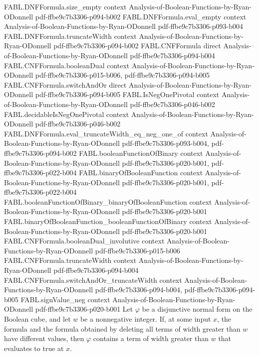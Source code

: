 \begin{theorem}
\proofstep
  {FABL.DNFFormula.size_empty}
  {context}
  {Analysis-of-Boolean-Functions-by-Ryan-ODonnell}
  {pdf-ffbe9c7b3306-p094-b002}
\proofstep
  {FABL.DNFFormula.eval_empty}
  {context}
  {Analysis-of-Boolean-Functions-by-Ryan-ODonnell}
  {pdf-ffbe9c7b3306-p093-b004}
\proofstep
  {FABL.DNFFormula.truncateWidth}
  {context}
  {Analysis-of-Boolean-Functions-by-Ryan-ODonnell}
  {pdf-ffbe9c7b3306-p094-b002}
\proofstep
  {FABL.CNFFormula}
  {direct}
  {Analysis-of-Boolean-Functions-by-Ryan-ODonnell}
  {pdf-ffbe9c7b3306-p094-b004}
\proofstep
  {FABL.CNFFormula.booleanDual}
  {context}
  {Analysis-of-Boolean-Functions-by-Ryan-ODonnell}
  {pdf-ffbe9c7b3306-p015-b006,
    pdf-ffbe9c7b3306-p094-b005}
\proofstep
  {FABL.CNFFormula.switchAndOr}
  {direct}
  {Analysis-of-Boolean-Functions-by-Ryan-ODonnell}
  {pdf-ffbe9c7b3306-p094-b005}
\proofstep
  {FABL.IsNegOnePivotal}
  {context}
  {Analysis-of-Boolean-Functions-by-Ryan-ODonnell}
  {pdf-ffbe9c7b3306-p046-b002}
\proofstep
  {FABL.decidableIsNegOnePivotal}
  {context}
  {Analysis-of-Boolean-Functions-by-Ryan-ODonnell}
  {pdf-ffbe9c7b3306-p046-b002}
\proofstep
  {FABL.DNFFormula.eval_truncateWidth_eq_neg_one_of}
  {context}
  {Analysis-of-Boolean-Functions-by-Ryan-ODonnell}
  {pdf-ffbe9c7b3306-p093-b004,
    pdf-ffbe9c7b3306-p094-b002}
\proofstep
  {FABL.booleanFunctionOfBinary}
  {context}
  {Analysis-of-Boolean-Functions-by-Ryan-ODonnell}
  {pdf-ffbe9c7b3306-p020-b001,
    pdf-ffbe9c7b3306-p022-b004}
\proofstep
  {FABL.binaryOfBooleanFunction}
  {context}
  {Analysis-of-Boolean-Functions-by-Ryan-ODonnell}
  {pdf-ffbe9c7b3306-p020-b001,
    pdf-ffbe9c7b3306-p022-b004}
\proofstep
  {FABL.booleanFunctionOfBinary_binaryOfBooleanFunction}
  {context}
  {Analysis-of-Boolean-Functions-by-Ryan-ODonnell}
  {pdf-ffbe9c7b3306-p020-b001}
\proofstep
  {FABL.binaryOfBooleanFunction_booleanFunctionOfBinary}
  {context}
  {Analysis-of-Boolean-Functions-by-Ryan-ODonnell}
  {pdf-ffbe9c7b3306-p020-b001}
\proofstep
  {FABL.CNFFormula.booleanDual_involutive}
  {context}
  {Analysis-of-Boolean-Functions-by-Ryan-ODonnell}
  {pdf-ffbe9c7b3306-p015-b006}
\proofstep
  {FABL.CNFFormula.truncateWidth}
  {context}
  {Analysis-of-Boolean-Functions-by-Ryan-ODonnell}
  {pdf-ffbe9c7b3306-p094-b004}
\proofstep
  {FABL.CNFFormula.switchAndOr_truncateWidth}
  {context}
  {Analysis-of-Boolean-Functions-by-Ryan-ODonnell}
  {pdf-ffbe9c7b3306-p094-b004,
    pdf-ffbe9c7b3306-p094-b005}
\proofstep
  {FABL.signValue_neg}
  {context}
  {Analysis-of-Boolean-Functions-by-Ryan-ODonnell}
  {pdf-ffbe9c7b3306-p020-b001}
Let $\varphi$ be a disjunctive normal form on the Boolean cube, and let $w$ be a
nonnegative integer. If, at some input $x$, the formula and the formula obtained by
deleting all terms of width greater than $w$ have different values, then $\varphi$
contains a term of width greater than $w$ that evaluates to true at $x$.
\end{theorem}

